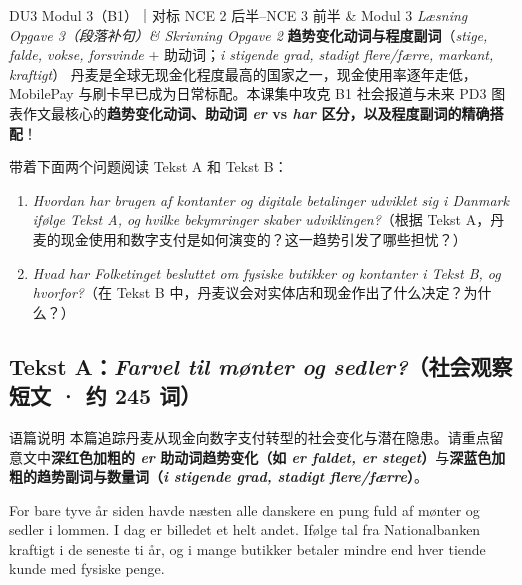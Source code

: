 {DU3 Modul 3（B1）｜对标 NCE 2 后半--NCE 3 前半 \& Modul 3 \textit{Læsning Opgave 3（段落补句）\& Skrivning Opgave 2}}
{\textbf{趋势变化动词与程度副词}（\textit{stige, falde, vokse, forsvinde} +  助动词；\textit{i stigende grad, stadigt flere/færre, markant, kraftigt}）}
{丹麦是全球无现金化程度最高的国家之一，现金使用率逐年走低，MobilePay 与刷卡早已成为日常标配。本课集中攻克 B1 社会报道与未来 PD3 图表作文最核心的\textbf{趋势变化动词、助动词 \textit{er} vs \textit{har} 区分，以及程度副词的精确搭配}！}

\begin{foerduleaeser}
带着下面两个问题阅读 Tekst A 和 Tekst B：
\begin{enumerate}
  \item \textit{Hvordan har brugen af kontanter og digitale betalinger udviklet sig i Danmark ifølge Tekst A, og hvilke bekymringer skaber udviklingen?}（根据 Tekst A，丹麦的现金使用和数字支付是如何演变的？这一趋势引发了哪些担忧？）
  \item \textit{Hvad har Folketinget besluttet om fysiske butikker og kontanter i Tekst B, og hvorfor?}（在 Tekst B 中，丹麦议会对实体店和现金作出了什么决定？为什么？）
\end{enumerate}
\end{foerduleaeser}


\subsection*{Tekst A：\textit{Farvel til mønter og sedler?}（社会观察短文 · 约 245 词）}

\begin{tipbox}{语篇说明}
本篇追踪丹麦从现金向数字支付转型的社会变化与潜在隐患。请重点留意文中\textbf{\color{NCDRed}深红色加粗的 \textit{er} 助动词趋势变化（如 \textit{er faldet, er steget}）}与\textbf{\color{NCDNavy}深蓝色加粗的趋势副词与数量词（\textit{i stigende grad, stadigt flere/færre}）}。
\end{tipbox}

For bare tyve år siden havde næsten alle danskere en pung fuld af mønter og sedler i lommen. I dag er billedet et helt andet. Ifølge tal fra Nationalbanken  kraftigt i de seneste ti år, og i mange butikker betaler mindre end hver tiende kunde med fysiske penge.

